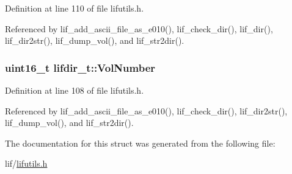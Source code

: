 Definition at line 110 of file lifutils.\+h.



Referenced by lif\+\_\+add\+\_\+ascii\+\_\+file\+\_\+as\+\_\+e010(), lif\+\_\+check\+\_\+dir(), lif\+\_\+dir(), lif\+\_\+dir2str(), lif\+\_\+dump\+\_\+vol(), and lif\+\_\+str2dir().

\subsubsection[{\texorpdfstring{Vol\+Number}{VolNumber}}]{\setlength{\rightskip}{0pt plus 5cm}uint16\+\_\+t lifdir\+\_\+t\+::\+Vol\+Number}\hypertarget{structlifdir__t_a30c6a4231c58d2d43dc31e06bda5a687}{}\label{structlifdir__t_a30c6a4231c58d2d43dc31e06bda5a687}


Definition at line 108 of file lifutils.\+h.



Referenced by lif\+\_\+add\+\_\+ascii\+\_\+file\+\_\+as\+\_\+e010(), lif\+\_\+check\+\_\+dir(), lif\+\_\+dir2str(), lif\+\_\+dump\+\_\+vol(), and lif\+\_\+str2dir().



The documentation for this struct was generated from the following file\+:\begin{DoxyCompactItemize}
\item 
lif/\hyperlink{lifutils_8h}{lifutils.\+h}\end{DoxyCompactItemize}
